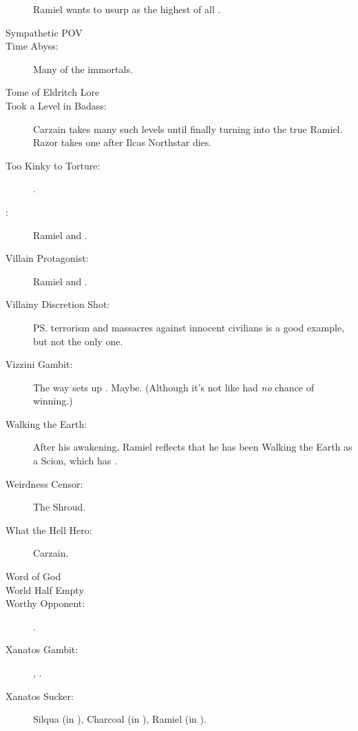 \begin{flushleft}
\begin{description}
    Ramiel wants to usurp \Azraid{} as the highest of all \resphain. 
  \item[Sympathetic POV]
  \item[Time Abyss:] Many of the immortals. 
  \item[Tome of Eldritch Lore]
  \item[Took a Level in Badass:] 
    \subitem Carzain takes many such levels until finally turning into the true Ramiel. 
    \subitem Razor takes one after Ilcas Northstar dies.
  \item[Too Kinky to Torture:] \Nexagglachel.
  \item[\Ubermensch:] Ramiel and \Ishna.
  \item[Villain Protagonist:] Ramiel and \Ishna. 
  \item[Villainy Discretion Shot:] 
    \ps{\Ishnaruchaefir} terrorism and massacres against innocent civilians  is a good example, but not the only one. 
  \item[Vizzini Gambit:] 
    The way \Ishnaruchaefir{} sets up \Teshrial. 
    Maybe. 
    (Although it's not like \Teshrial{} had \emph{no} chance of winning.)
  \item[Walking the Earth:]
    After his awakening, Ramiel reflects that he has been Walking the Earth as a Scion, which has . 
  \item[Weirdness Censor:] The Shroud.
  \item[What the Hell Hero:] Carzain. 
  \item[Word of God]
  \item[World Half Empty] 
  \item[Worthy Opponent:] \Narkiza. 
  \item[Xanatos Gambit:] \Daggerrain, \Secherdamon. 
  \item[Xanatos Sucker:] 
    Silqua (in \SilquaBookEmph), 
    Charcoal (in \TwilightAngelRememberEmph), 
    Ramiel (in \SentinelsFinalBookEmph). 
\end{description}


\end{flushleft}
